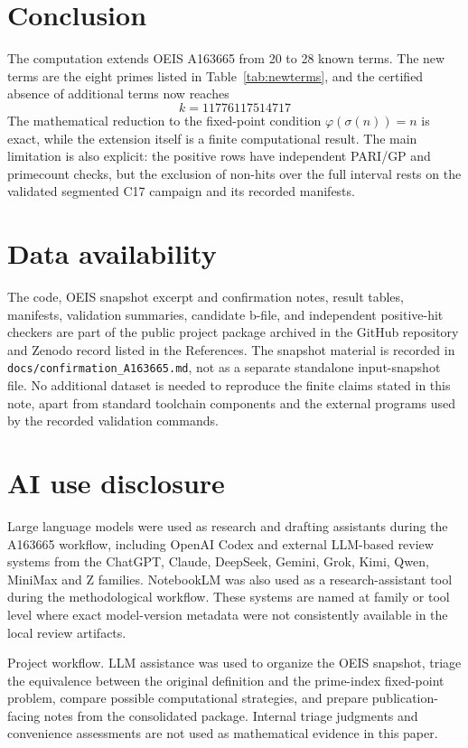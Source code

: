 \documentclass[11pt]{article}
\theoremstyle{definition}
\theoremstyle{remark}
\newcommand{\seqid}{A163665}
\begin{document}
\section{Conclusion}

The computation extends OEIS \seqid{} from 20 to 28 known terms.  The
new terms are the eight primes listed in Table~\ref{tab:newterms}, and
the certified absence of additional terms now reaches
\[
  k=11776117514717
\]
The mathematical reduction to the fixed-point condition
\(\varphi(\sigma(n))=n\) is exact, while the extension itself is a finite
computational result.  The main limitation is also explicit: the positive
rows have independent PARI/GP and primecount checks, but the exclusion of
non-hits over the full interval rests on the validated segmented C17
campaign and its recorded manifests.

\section*{Data availability}

The code, OEIS snapshot excerpt and confirmation notes, result tables,
manifests, validation summaries, candidate b-file, and independent
positive-hit checkers are part of the public project package archived in
the GitHub repository and Zenodo record listed in the References.  The
snapshot material is
recorded in \texttt{docs/confirmation\_A163665.md}, not as a separate
standalone input-snapshot file.  No additional dataset is needed to
reproduce the finite claims stated in this note, apart from standard
toolchain components and the external programs used by the recorded
validation commands.

\section*{AI use disclosure}

Large language models were used as research and drafting assistants during the
\seqid{} workflow, including OpenAI Codex and external LLM-based review systems
from the ChatGPT, Claude, DeepSeek, Gemini, Grok, Kimi, Qwen, MiniMax and Z
families.  NotebookLM was also used as a research-assistant tool during the
methodological workflow.  These systems are named at family or tool level where
exact model-version metadata were not consistently available in the local
review artifacts.

Project workflow.  LLM assistance was used to organize the OEIS snapshot,
triage the equivalence between the original definition and the prime-index
fixed-point problem, compare possible computational strategies, and prepare
publication-facing notes from the consolidated package.  Internal triage
judgments and convenience assessments are not used as mathematical evidence in
this paper.
\end{document}
